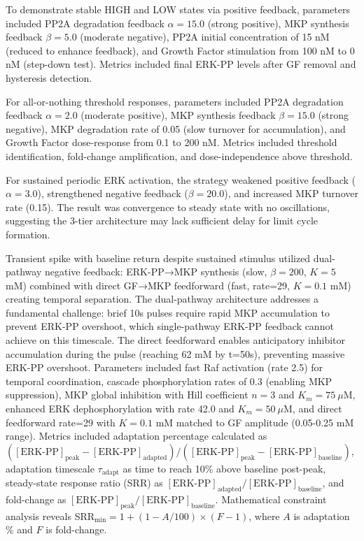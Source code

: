 \documentclass[twocolumn,11pt]{article}
\begin{document}
To demonstrate stable HIGH and LOW states via positive feedback, parameters included PP2A degradation feedback $\alpha = 15.0$ (strong positive), MKP synthesis feedback $\beta = 5.0$ (moderate negative), PP2A initial concentration of 15 nM (reduced to enhance feedback), and Growth Factor stimulation from 100 nM to 0 nM (step-down test). Metrics included final ERK-PP levels after GF removal and hysteresis detection.

For all-or-nothing threshold responses, parameters included PP2A degradation feedback $\alpha = 2.0$ (moderate positive), MKP synthesis feedback $\beta = 15.0$ (strong negative), MKP degradation rate of 0.05 (slow turnover for accumulation), and Growth Factor dose-response from 0.1 to 200 nM. Metrics included threshold identification, fold-change amplification, and dose-independence above threshold.

For sustained periodic ERK activation, the strategy weakened positive feedback ($\alpha = 3.0$), strengthened negative feedback ($\beta = 20.0$), and increased MKP turnover rate (0.15). The result was convergence to steady state with no oscillations, suggesting the 3-tier architecture may lack sufficient delay for limit cycle formation.

Transient spike with baseline return despite sustained stimulus utilized dual-pathway negative feedback: ERK-PP→MKP synthesis (slow, $\beta=200$, $K=5$ mM) combined with direct GF→MKP feedforward (fast, rate=29, $K=0.1$ mM) creating temporal separation. The dual-pathway architecture addresses a fundamental challenge: brief 10s pulses require rapid MKP accumulation to prevent ERK-PP overshoot, which single-pathway ERK-PP feedback cannot achieve on this timescale. The direct feedforward enables anticipatory inhibitor accumulation during the pulse (reaching 62 mM by t=50s), preventing massive ERK-PP overshoot. Parameters included fast Raf activation (rate 2.5) for temporal coordination, cascade phosphorylation rates of 0.3 (enabling MKP suppression), MKP global inhibition with Hill coefficient $n=3$ and $K_m=75~\mu$M, enhanced ERK dephosphorylation with rate 42.0 and $K_m=50~\mu$M, and direct feedforward rate=29 with $K=0.1$ mM matched to GF amplitude (0.05-0.25 mM range). Metrics included adaptation percentage calculated as $([\text{ERK-PP}]_{\text{peak}} - [\text{ERK-PP}]_{\text{adapted}}) / ([\text{ERK-PP}]_{\text{peak}} - [\text{ERK-PP}]_{\text{baseline}})$, adaptation timescale $\tau_{\text{adapt}}$ as time to reach 10\% above baseline post-peak, steady-state response ratio (SRR) as $[\text{ERK-PP}]_{\text{adapted}} / [\text{ERK-PP}]_{\text{baseline}}$, and fold-change as $[\text{ERK-PP}]_{\text{peak}} / [\text{ERK-PP}]_{\text{baseline}}$. Mathematical constraint analysis reveals SRR$_{\text{min}} = 1 + (1 - A/100) \times (F - 1)$, where $A$ is adaptation \% and $F$ is fold-change.
\end{document}

